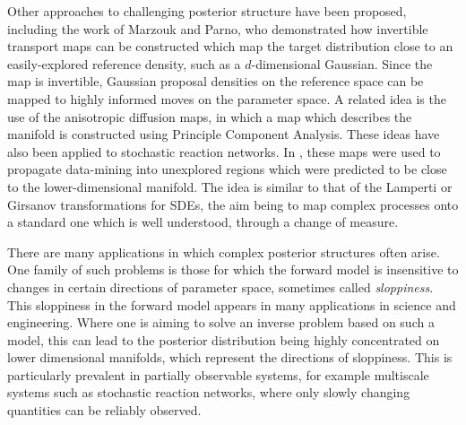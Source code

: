 \documentclass[final]{siamltex}
\newcommand{\edit}[1]{{\color{red} #1}}
\begin{document}
Other approaches to challenging posterior structure have been
proposed, including the work of Marzouk and Parno\cite{parno2018transport}, who
demonstrated how invertible transport maps can be constructed which
map the target distribution close to an easily-explored reference
density, such as a $d$-dimensional Gaussian. Since the map is
invertible, Gaussian proposal densities on the reference space can be
mapped to highly informed moves on the parameter space. A related idea
is the use of the anisotropic diffusion maps\cite{singer2008non}, in
which a map which describes the manifold is constructed using
Principle Component Analysis. These ideas have also been applied to
stochastic reaction
networks\cite{singer2009detecting,dsilva2016data}. In
\cite{chiavazzo2017intrinsic}, these maps were used to propagate
data-mining into unexplored regions which were predicted to be close
to the lower-dimensional manifold. The idea is similar to that of the
Lamperti or Girsanov transformations for SDEs\cite{flandrin2003stationarity,gardiner2009stochastic},  the aim being to map complex
processes onto a standard one which is well understood, through a
change of measure.

\edit{
There are many applications in which complex posterior structures
often arise. One family of such problems is those for which the
forward model is insensitive to changes in certain directions of
parameter space, sometimes called
\emph{sloppiness}\cite{gutenkunst2007universally,apgar2010sloppy}. This
sloppiness in the forward model appears in many applications in
science and engineering\cite{constantine2014active}. Where one is
aiming to solve an inverse problem based on such a model, this can
lead to the posterior distribution being highly concentrated on lower
dimensional manifolds, which represent the directions of
sloppiness. This is particularly prevalent in partially observable
systems, for example multiscale systems such
as stochastic reaction networks, where only slowly changing quantities
can be reliably observed.}



\end{document}
